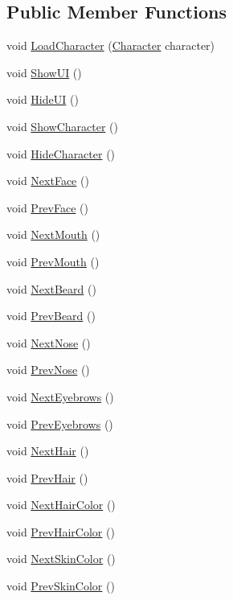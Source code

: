 \subsection*{Public Member Functions}
\begin{DoxyCompactItemize}
\item 
void \mbox{\hyperlink{class_portrait_a003483e7707bbb34e09ef3736e5b5b41}{Load\+Character}} (\mbox{\hyperlink{class_character}{Character}} character)
\item 
void \mbox{\hyperlink{class_portrait_a5469fe5b40d6ac458f87f2748cb0805c}{Show\+UI}} ()
\item 
void \mbox{\hyperlink{class_portrait_ac5ab4bb350640a35c516bffa2fc45fe3}{Hide\+UI}} ()
\item 
void \mbox{\hyperlink{class_portrait_ab8365d52d39bacdb043a5f707e9c17ef}{Show\+Character}} ()
\item 
void \mbox{\hyperlink{class_portrait_a3a0b6a4d3c9909127c51c4c4f4b152f5}{Hide\+Character}} ()
\item 
void \mbox{\hyperlink{class_portrait_aaa0da57aae916077e97d6c9d0a48aa4d}{Next\+Face}} ()
\item 
void \mbox{\hyperlink{class_portrait_aa550ccd7202589090d88e812743da74a}{Prev\+Face}} ()
\item 
void \mbox{\hyperlink{class_portrait_ae5ff256c7c14879853d221dfd9df2d63}{Next\+Mouth}} ()
\item 
void \mbox{\hyperlink{class_portrait_ac81c66115ce3df6a35af825e43742211}{Prev\+Mouth}} ()
\item 
void \mbox{\hyperlink{class_portrait_a357f23630fd1689f2de8ef7a114c151e}{Next\+Beard}} ()
\item 
void \mbox{\hyperlink{class_portrait_ada91686eb3d44e5771a81dc147462258}{Prev\+Beard}} ()
\item 
void \mbox{\hyperlink{class_portrait_a7fc2c7d9f078303182503c717c05b9d5}{Next\+Nose}} ()
\item 
void \mbox{\hyperlink{class_portrait_afc5cd84e6086e462adb30f0d988c76b6}{Prev\+Nose}} ()
\item 
void \mbox{\hyperlink{class_portrait_a6390e5c0ba5e52e4913703caf40682cd}{Next\+Eyebrows}} ()
\item 
void \mbox{\hyperlink{class_portrait_abce38ec7263bad9ae029b40e585fe6b1}{Prev\+Eyebrows}} ()
\item 
void \mbox{\hyperlink{class_portrait_ae14081edd428a837484936bc56350a12}{Next\+Hair}} ()
\item 
void \mbox{\hyperlink{class_portrait_af7fdde58c645c6e4fa5195ed3547b3d9}{Prev\+Hair}} ()
\item 
void \mbox{\hyperlink{class_portrait_a8117eeefced674e0a4a483745ea0053d}{Next\+Hair\+Color}} ()
\item 
void \mbox{\hyperlink{class_portrait_a29b9670f2b653ffe43cf81e94e90062a}{Prev\+Hair\+Color}} ()
\item 
void \mbox{\hyperlink{class_portrait_a601ece8887c692a5a9f6d910fd3a2cec}{Next\+Skin\+Color}} ()
\item 
void \mbox{\hyperlink{class_portrait_acbaf5360b4efe38e96ae08816ee94ccb}{Prev\+Skin\+Color}} ()
\end{DoxyCompactItemize}
